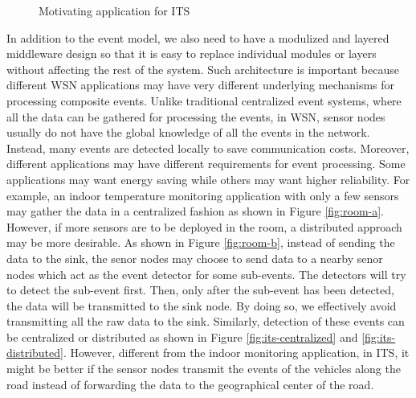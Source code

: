 \begin{figure}
\centering
{}
\caption{Motivating application for ITS}
\label{fig:its}
\end{figure}

In addition to the event model, we also need to have a modulized and layered middleware design so that it is easy to replace individual modules or layers without affecting the rest of the system. Such architecture is important because different WSN applications may have very different underlying mechanisms for processing composite events. Unlike traditional centralized event systems, where all the data can be gathered for processing the events, in WSN, sensor nodes usually do not have the global knowledge of all the events in the network. Instead, many events are detected locally to save communication costs. Moreover, different applications may have different requirements for event processing. Some applications may want energy saving while others may want higher reliability. For example, an indoor temperature monitoring application with only a few sensors may gather the data in a centralized fashion as shown in Figure \ref{fig:room-a}. However, if more sensors are to be deployed in the room, a distributed approach may be more desirable. As shown in Figure \ref{fig:room-b}, instead of sending the data to the sink, the senor nodes may choose to send data to a nearby senor nodes which act as the event detector for some sub-events. The detectors will try to detect the sub-event first. Then, only after the sub-event has been detected, the data will be transmitted to the sink node. By doing so, we effectively avoid transmitting all the raw data to the sink. Similarly, detection of these events can be centralized or distributed as shown in Figure \ref{fig:its-centralized} and \ref{fig:its-distributed}. However, different from the indoor monitoring application, in ITS, it might be better if the sensor nodes transmit the events of the vehicles along the road instead of forwarding the data to the geographical center of the road. 

